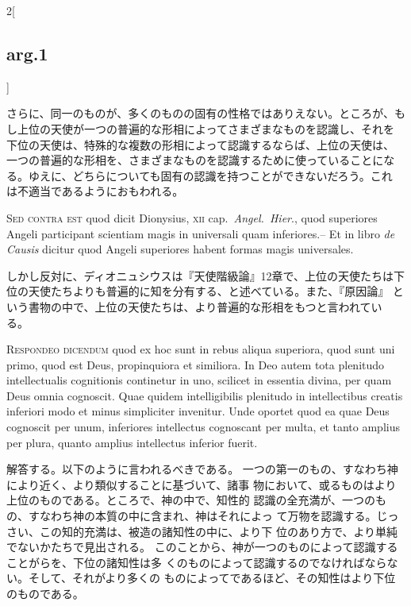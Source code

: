\documentclass[paper=a4paper,fontsize=10pt,jafontsize=9pt,titlepage]{jlreq}
\begin{document}
\begin{paracol}{2}[\subsection{arg.1}]
\switchcolumn

さらに、同一のものが、多くのものの固有の性格ではありえない。ところが、も
 し上位の天使が一つの普遍的な形相によってさまざまなものを認識し、それを
 下位の天使は、特殊的な複数の形相によって認識するならば、上位の天使は、
 一つの普遍的な形相を、さまざまなものを認識するために使っていることにな
 る。ゆえに、どちらについても固有の認識を持つことができないだろう。これ
 は不適当であるようにおもわれる。

\switchcolumn*[\subsection{s.c.}]

{\scshape  Sed contra est} quod dicit Dionysius, {\scshape xii}
cap.~{\itshape Angel.~Hier}., quod superiores Angeli participant scientiam magis in
universali quam inferiores.-- Et in libro {\itshape de Causis} dicitur quod Angeli
superiores habent formas magis universales.

\switchcolumn

しかし反対に、ディオニュシウスは『天使階級論』12章で、上位の天使たちは下
 位の天使たちよりも普遍的に知を分有する、と述べている。また、『原因論』
 という書物の中で、上位の天使たちは、より普遍的な形相をもつと言われてい
 る。


{\scshape Respondeo dicendum} quod ex hoc sunt in rebus
aliqua superiora, quod sunt uni primo, quod est Deus, propinquiora et
similiora. In Deo autem tota plenitudo intellectualis cognitionis
continetur in uno, scilicet in essentia divina, per quam Deus omnia
cognoscit. Quae quidem intelligibilis plenitudo in intellectibus creatis
inferiori modo et minus simpliciter invenitur. Unde oportet quod ea quae
Deus cognoscit per unum, inferiores intellectus cognoscant per multa, et
tanto amplius per plura, quanto amplius intellectus inferior fuerit.

\switchcolumn

解答する。以下のように言われるべきである。
一つの第一のもの、すなわち神により近く、より類似することに基づいて、諸事
 物において、或るものはより上位のものである。ところで、神の中で、知性的
 認識の全充満が、一つのもの、すなわち神の本質の中に含まれ、神はそれによっ
 て万物を認識する。じっさい、この知的充満は、被造の諸知性の中に、より下
 位のあり方で、より単純でないかたちで見出される。
このことから、神が一つのものによって認識することがらを、下位の諸知性は多
 くのものによって認識するのでなければならない。そして、それがより多くの
 ものによってであるほど、その知性はより下位のものである。


\end{paracol}
\end{document}
